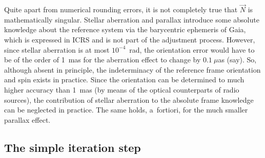 \documentclass[structabstract]{aa}
\begin{document}
Quite apart from numerical rounding errors, it is not completely
true that $\vec{N}$ is mathematically singular. Stellar aberration and
parallax introduce some absolute knowledge about the reference system
via the barycentric ephemeris of Gaia, which is expressed in ICRS and
is not part of the adjustment process. However, since stellar
aberration is at most $10^{-4}$~rad, the orientation error would have
to be of the order of 1~mas for the aberration effect to change by
$0.1~\mu$as (say). So, although absent in principle, the indeterminacy
of the reference frame orientation and spin exists in practice.
Since the orientation can be determined to much
higher accuracy than 1~mas (by means of the optical counterparts of radio sources),
the contribution of stellar aberration to the absolute frame knowledge
can be neglected in practice. The same holds, a~fortiori, for the
much smaller parallax effect.


\subsection{The simple iteration step}\label{sec:iter}
\end{document}
